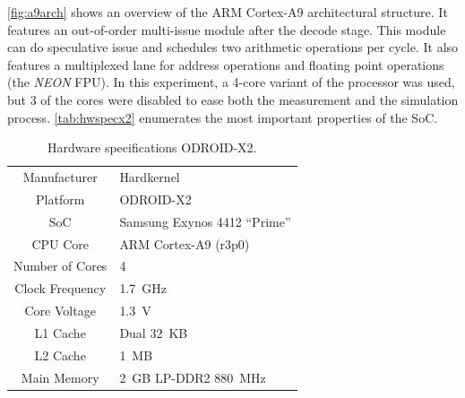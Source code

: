 \autoref{fig:a9arch} shows an overview of the ARM Cortex-A9 architectural
structure. It features an out-of-order multi-issue module after the decode
stage. This module can do speculative issue and schedules two arithmetic
operations per cycle. It also features a multiplexed lane for address operations
and floating point operations (the \emph{NEON} FPU). In this experiment, a
4-core variant of the processor was used, but 3 of the cores were disabled to
ease both the measurement and the simulation process. \autoref{tab:hwspecx2}
enumerates the most important properties of the SoC.


\begin{table}
    \centering
    \begin{tabular}{|c|l|}
        \rowcolor{gray!25}
        \hline
        Manufacturer   & Hardkernel \\
        Platform       & ODROID-X2 \\
        SoC            & Samsung Exynos 4412 ``Prime'' \\
        CPU Core       & ARM Cortex-A9 (r3p0) \\
        Number of Cores& 4 \\
        Clock Frequency& 1.7~GHz \\
        Core Voltage   & 1.3~V \\
        L1 Cache       & Dual 32~KB \\
        L2 Cache       & 1~MB \\
        Main Memory    & 2~GB LP-DDR2 880~MHz \\
        \hline
    \end{tabular}
    \caption{Hardware specifications ODROID-X2.}
    \label{tab:hwspecx2}
\end{table}

